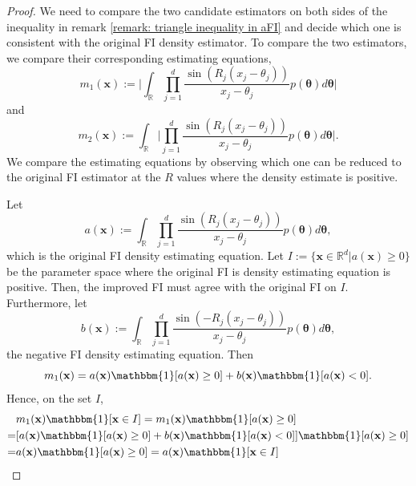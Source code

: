 \documentclass[%
 reprint,
 amsmath,amssymb,
 aps,
]{revtex4-2}
\def\R{\mathbb{R}}
\def\btheta{\boldsymbol{\theta}}
\def\btheta{\boldsymbol{\theta}}
\def\xbold{\mathbf{x}}
\newcommand{\btheta}{\mbox{\boldmath $\theta$}}
\begin{document}
\begin{proof}
    We need to compare the two candidate estimators on both sides of the inequality in remark \ref{remark: triangle inequality in aFI} and decide which one is consistent with the original FI density estimator. To compare the two estimators, we compare their corresponding estimating equations,
    \begin{equation*}
         m_1(\xbold) := \bigg|\int_\R \prod_{j = 1}^d \frac{\sin(R_j(x_j - \theta_j))}{x_j - \theta_j} p(\btheta)d\btheta\bigg|
    \end{equation*}
    and
    \begin{equation*}
        m_2(\xbold) := \int_\R \bigg|\prod_{j = 1}^d \frac{\sin(R_j(x_j - \theta_j))}{x_j - \theta_j} p(\btheta)d\btheta\bigg|.
    \end{equation*}
    We compare the estimating equations by observing which one can be reduced to the original FI estimator at the $R$ values where the density estimate is positive.

    Let
    \begin{equation*}
        a(\xbold) := \int_\R \prod_{j = 1}^d \frac{\sin(R_j(x_j - \theta_j))}{x_j - \theta_j} p(\btheta)d\btheta,
    \end{equation*}
    which is the original FI density estimating equation. Let $I := \{\xbold \in \R^d | a(\xbold) \ge 0\}$ be the parameter space where the original FI is density estimating equation is positive. Then, the improved FI must agree with the original FI on $I$. Furthermore, let
    \begin{equation*}
        b(\xbold) := \int_\R \prod_{j = 1}^d \frac{\sin(-R_j(x_j - \theta_j))}{x_j - \theta_j} p(\btheta)d\btheta,
    \end{equation*}
    the negative FI density estimating equation. Then
    \begin{equation*}
        m_1(\xbold) = a(\xbold)\mathbbm{1}[a(\xbold) \ge 0] + b(\xbold) \mathbbm{1}[a(\xbold) < 0].
    \end{equation*}
    Hence, on the set $I$,
    \begin{align*}
        & m_1(\xbold)\mathbbm{1}[\xbold \in I] = m_1(\xbold)\mathbbm{1}[a(\xbold) \ge 0] \\
        = & [a(\xbold)\mathbbm{1}[a(\xbold) \ge 0] + b(\xbold) \mathbbm{1}[a(\xbold) < 0]]\mathbbm{1}[a(\xbold) \ge 0] \\
        = & a(\xbold)\mathbbm{1}[a(\xbold) \ge 0] = a(\xbold)\mathbbm{1}[\xbold \in I]
    \end{align*}


\end{proof}
\end{document}
